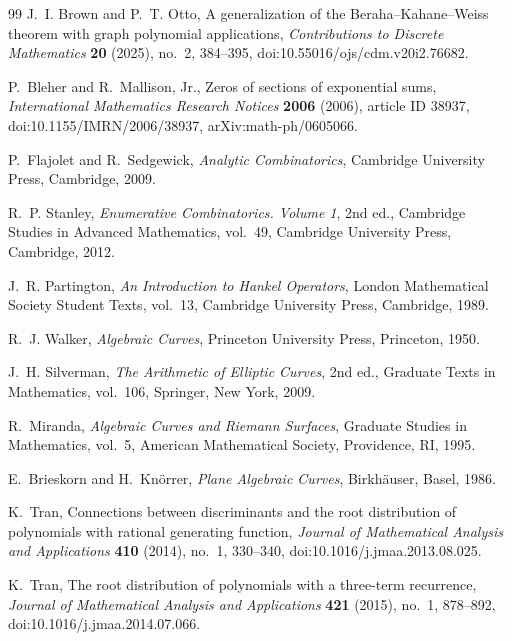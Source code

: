 \begin{thebibliography}{99}
J.~I. Brown and P.~T. Otto,
\newblock A generalization of the Beraha--Kahane--Weiss theorem with graph polynomial applications,
\newblock \emph{Contributions to Discrete Mathematics} \textbf{20} (2025), no.~2, 384--395,
\newblock doi:10.55016/ojs/cdm.v20i2.76682.

P.~Bleher and R.~Mallison, Jr.,
\newblock Zeros of sections of exponential sums,
\newblock \emph{International Mathematics Research Notices} \textbf{2006} (2006), article ID 38937,
\newblock doi:10.1155/IMRN/2006/38937, arXiv:math-ph/0605066.

P.~Flajolet and R.~Sedgewick,
\newblock \emph{Analytic Combinatorics},
\newblock Cambridge University Press, Cambridge, 2009.

R.~P. Stanley,
\newblock \emph{Enumerative Combinatorics. Volume 1},
\newblock 2nd ed., Cambridge Studies in Advanced Mathematics, vol.~49, Cambridge University Press, Cambridge, 2012.

J.~R. Partington,
\newblock \emph{An Introduction to Hankel Operators},
\newblock London Mathematical Society Student Texts, vol.~13, Cambridge University Press, Cambridge, 1989.

R.~J. Walker,
\newblock \emph{Algebraic Curves},
\newblock Princeton University Press, Princeton, 1950.

J.~H. Silverman,
\newblock \emph{The Arithmetic of Elliptic Curves},
\newblock 2nd ed., Graduate Texts in Mathematics, vol.~106, Springer, New York, 2009.

R.~Miranda,
\newblock \emph{Algebraic Curves and Riemann Surfaces},
\newblock Graduate Studies in Mathematics, vol.~5, American Mathematical Society, Providence, RI, 1995.

E.~Brieskorn and H.~Kn\"orrer,
\newblock \emph{Plane Algebraic Curves},
\newblock Birkh\"auser, Basel, 1986.

K.~Tran,
\newblock Connections between discriminants and the root distribution of polynomials with rational generating function,
\newblock \emph{Journal of Mathematical Analysis and Applications} \textbf{410} (2014), no.~1, 330--340,
\newblock doi:10.1016/j.jmaa.2013.08.025.

K.~Tran,
\newblock The root distribution of polynomials with a three-term recurrence,
\newblock \emph{Journal of Mathematical Analysis and Applications} \textbf{421} (2015), no.~1, 878--892,
\newblock doi:10.1016/j.jmaa.2014.07.066.


\end{thebibliography}
